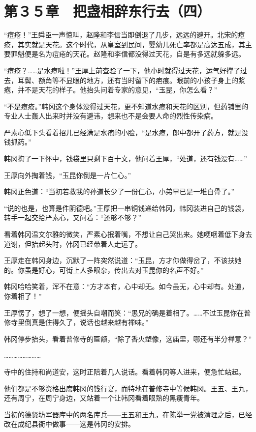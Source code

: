 \section{第３５章　把盏相辞东行去（四）}

“痘疮！”王舜臣一声惊叫，赵隆和李信当即倒退了几步，远远的避开。北宋的痘疮，其实就是天花。这个时代，从皇室到民间，婴幼儿死亡率都是高达五成，其主要罪魁便是名为痘疮的天花。赵隆和李信都没得过天花，自是有多远就躲多远。

“痘疮？……是水痘啦！”王厚上前查验了一下，他小时就得过天花，运气好撑了过去，耳鬓、额角等不显眼的地方，还有当时留下的疤痕。眼前的小孩子身上的浆疱，并不是天花的样子。他抬头问着专家的意见，“玉昆，你怎么看？”

“不是痘疮。”韩冈这个身体没得过天花，更不知道水痘和天花的区别，但药铺里的专业人士轰人出来时并没有避讳，想来也不是会要人命的烈性传染病。

严素心低下头看着招儿已经满是水疱的小脸，“是水痘，郎中都开了药方，就是没钱抓药。”

韩冈掏了一下怀中，钱袋里只剩下百十文，他问着王厚，“处道，还有钱没有……”

王厚向外掏着钱，“玉昆你倒是一片仁心。”

韩冈正色道：“当初若救我的孙道长少了一份仁心，小弟早已是一堆白骨了。”

“说的也是，也算是件阴德吧。”王厚把一串铜钱递给韩冈，韩冈装进自己的钱袋，转手一起交给严素心，又问着：“还够不够？”

看着韩冈温文尔雅的微笑，严素心抿着嘴，不想让自己哭出来。她哽咽着低下身去道谢，但抬起头时，韩冈已经带着人走远了。

王厚走在韩冈身边，沉默了一阵突然说道：“玉昆，方才你做得岔了，不该扶她的。你虽是好心，可街上人多眼杂，传出去对玉昆你的名声不好。”

韩冈哈哈笑着，浑不在意：“方才本有，心中却无。如今虽无，心中却有。处道，你着相了！”

王厚愣了，想了一想，便摇头自嘲而笑：“愚兄的确是着相了。……不过玉昆你在普修寺里倒真是住得久了，说话也越来越有禅味。”

韩冈停步抬头，看着普修寺的匾额，“除了香火塑像，这庙里，哪还有半分禅意？”

……………………

寺中的住持和尚道安，这时正陪着几人说话。看着韩冈等人进来，便急忙站起。

他们都是不够资格出席韩冈的饯行宴，而特地在普修寺中等候韩冈。王五、王九，还有周宁，在周宁身边，又站着一个让韩冈看着眼熟的黑瘦青年。

当初的德贤坊军器库中的两名库兵——王五和王九，在陈举一党被清理之后，已经改在成纪县衙中做事——这是韩冈的安排。

